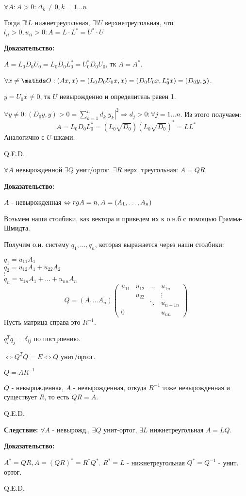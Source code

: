 
$\forall A : A>0: \Delta_k \neq 0, k = 1\ldots n$

Тогда $\exists! L$ нижнетреугольная, $\exists ! U$ верхнетреугольная, что $l_{ii}>0, u_{ii}>0:A = L \cdot L^* = U^*\cdot U$

\textbf{Доказательство:}

$A = L_0D_0 U_0 = L_0 D_0 L_0^* = U_0^* D_0 U_0$, тк $A = A^*$.

$\forall x \neq \zero : (Ax, x)  = (L_0D_0 U_0x,x) = (D_0 U_0 x, L_0^*x) =   (D_0y,y)$.

$y = U_0x \neq 0 $, тк $U$ невырожденно и определитель равен 1.

$\forall y \neq 0: (D_0y,y)>0 = \sum\limits_{k=1}^n d_k |y_k|^2 \Rightarrow d_j > 0: \forall j = 1\ldots n$. Из этого получаем:
$$A = L_0 D_0 L_0^* = (L_0 \sqrt{D_0})(L_0 \sqrt{D_0})^* = L L^*$$
Аналогично с $U$-шками.

\hfill Q.E.D.


$\forall A$ невырожденной $\exists Q$ унит/ортог. $\exists R$ верх. треугольная: $A = QR$

\textbf{Доказательство:}

$A$ - невырожденная $\Leftrightarrow rg A = n, A = (A_1,\ldots ,A_n)$

Возьмем наши столбики, как вектора и приведем их к о.н.б с помощью Грамма-Шмидта.

Получим о.н. систему $q_1,\ldots, q_n$, которая выражается через наши столбики:

$q_1 = u_{11}A_1$\\
$q_2 = u_{12}A_1 + u_{22}A_2$\\
$\vdots$\\
$q_n = u_{1n}A_1 + \ldots + u_{nn}A_n$
$$Q = (A_1 \ldots A_n) \begin{pmatrix}
    u_{11} & u_{12} & \ldots & u_{1n}\\
     & u_{22} & &\vdots\\
    & & \ddots & u_{n-1n}\\
   0 & & & u_{nn}
\end{pmatrix}$$
Пусть матрица справа это $R^{-1}$.

$q_{i}^T \overline{q_j} = \delta_{ij}$ по построению.

$\Leftrightarrow Q^T \overline{Q} = E \Leftrightarrow Q$ унит/ортог.

$Q = AR^{-1}$

$Q$ - невырожденная, $A$ - невырожденная, откуда $R^{-1}$ тоже невырожденная и существует $R$, то есть $QR = A$.

\hfill Q.E.D.

\textbf{Следствие:} $\forall A$ - невырожд., $\exists Q$ унит-ортог, $\exists L$ нижнетреугольная $A = LQ$.

\textbf{Доказательство:}

$A^* = QR, A = (QR)^*  = R^*Q^*$. $R^*=L$ - нижнетреугольная $Q^* = Q^{-1}$ - унит. ортог.

\hfill Q.E.D.